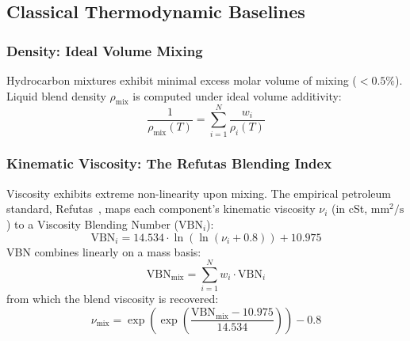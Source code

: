 \documentclass[11pt,a4paper]{article}
\begin{document}
\subsection{Classical Thermodynamic Baselines}

\subsubsection{Density: Ideal Volume Mixing}
Hydrocarbon mixtures exhibit minimal excess molar volume of mixing ($< 0.5\%$). Liquid blend density $\rho_{\text{mix}}$ is computed under ideal volume additivity:
\begin{equation}
    \frac{1}{\rho_{\text{mix}}(T)} = \sum_{i=1}^N \frac{w_i}{\rho_i(T)}
    \label{eq:dens_ideal}
\end{equation}

\subsubsection{Kinematic Viscosity: The Refutas Blending Index}
Viscosity exhibits extreme non-linearity upon mixing. The empirical petroleum standard, Refutas~\cite{maples2000petroleum}, maps each component's kinematic viscosity $\nu_i$ (in cSt, $\text{mm}^2/\text{s}$) to a Viscosity Blending Number ($\text{VBN}_i$):
\begin{equation}
    \text{VBN}_i = 14.534 \cdot \ln\left(\ln(\nu_i + 0.8)\right) + 10.975
\end{equation}
VBN combines linearly on a mass basis:
\begin{equation}
    \text{VBN}_{\text{mix}} = \sum_{i=1}^N w_i \cdot \text{VBN}_i
\end{equation}
from which the blend viscosity is recovered:
\begin{equation}
    \nu_{\text{mix}} = \exp\left(\exp\left(\frac{\text{VBN}_{\text{mix}} - 10.975}{14.534}\right)\right) - 0.8
    \label{eq:refutas}
\end{equation}
\end{document}
